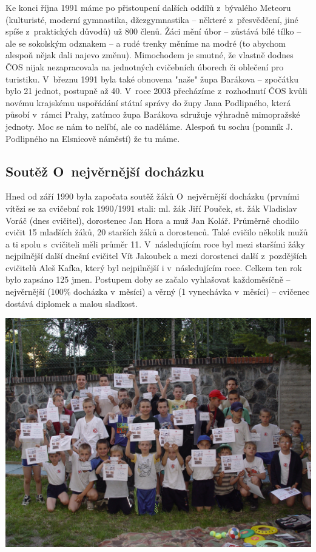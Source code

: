 \documentclass[a5paper, 11pt, twoside]{article}
\begin{document}
Ke konci října 1991 máme po přistoupení dalších oddílů z~bývalého
Meteoru (kulturisté, moderní gymnastika, džezgymnastika -- některé
z~přesvědčení, jiné spíše z~praktických důvodů) už 800 členů. Žáci mění
úbor -- zůstává bílé tílko -- ale se sokolským odznakem -- a rudé trenky
měníme na modré (to abychom alespoň nějak dali najevo změnu). Mimochodem
je smutné, že vlastně dodnes ČOS nijak nezapracovala na jednotných
cvičebních úborech či oblečení pro turistiku. V~březnu 1991 byla také
obnovena "naše" župa Barákova -- zpočátku bylo 21 jednot, postupně až
40. V~roce 2003 přecházíme z~rozhodnutí ČOS kvůli novému krajskému
uspořádání státní správy do župy Jana Podlipného, která působí v~rámci
Prahy, zatímco župa Barákova sdružuje výhradně mimopražské jednoty. Moc
se nám to nelíbí, ale co naděláme. Alespoň tu sochu (pomník J.
Podlipného na Elsnicově náměstí) že tu máme.

\subsection{Soutěž O~nejvěrnější
docházku}

Hned od září 1990 byla započata soutěž žáků O~nejvěrnější docházku
(prvními vítězi se za cvičební rok 1990/1991 stali: ml. žák Jiří Pouček,
st. žák Vladislav Voráč (dnes cvičitel), dorostenec Jan Hora a muž Jan
Kolář. Průměrně chodilo cvičit 15 mladších žáků, 20 starších žáků a
dorostenců. Také cvičilo několik mužů a ti spolu s~cvičiteli měli průměr
11. V~následujícím roce byl mezi staršími žáky nejpilnější další dnešní
cvičitel Vít Jakoubek a mezi dorostenci další z~pozdějších cvičitelů
Aleš Kafka, který byl nejpilnější i v~následujícím roce. Celkem ten rok
bylo zapsáno 125 jmen. Postupem doby se začalo vyhlašovat každoměsíčně
-- nejvěrnější (100\% docházka v~měsíci) a věrný (1 vynechávka v~měsíci)
-- cvičenec dostává diplomek a malou sladkost.

 \includegraphics[width=\textwidth]{img/37_vitezove_dochazka.JPG}
\end{document}
